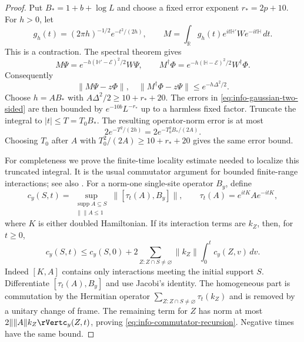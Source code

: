 \documentclass[11pt]{article}
\numberwithin{equation}{section}
\theoremstyle{definition}
\theoremstyle{remark}
\begin{document}
\begin{proof}
Put $B_*=1+b+\log L$ and choose a fixed error exponent
$r_*=2p+10$.  For $h>0$, let
\[
 g_h(t)=(2\pi h)^{-1/2}e^{-t^2/(2h)},\qquad
 M=\int_{\mathbb R}g_h(t)e^{it\mathbb H'}W e^{-it\mathbb H}\,dt.
\]
This is a contraction.  The spectral theorem gives
\[
 M\Psi=e^{-h(\mathbb H'-\mathcal E)^2/2}W\Psi,
 \qquad
 M^\dagger\Phi=e^{-h(\mathbb H-\mathcal E)^2/2}W^\dagger\Phi.
\]
Consequently
\begin{equation}
 \lVert M\Psi-z\Phi\rVert,\quad\lVert M^\dagger\Phi-z\Psi\rVert
       \le e^{-h\Delta^2/2}.
 \label{eq:info-gaussian-two-sided}
\end{equation}
Choose $h=A B_*$ with $A\Delta^2/2\ge10+r_*+20$.  The errors in
\eqref{eq:info-gaussian-two-sided} are then bounded by
$e^{-10b}L^{-r_*}$ up to a harmless fixed factor.  Truncate the integral
to $|t|\le T=T_0B_*$.  The resulting operator-norm error is at most
\[
 2e^{-T^2/(2h)}=2e^{-T_0^2 B_*/(2A)}.
\]
Choosing $T_0$ after $A$ with $T_0^2/(2A)\ge10+r_*+20$ gives the
same error bound.

For completeness we prove the finite-time locality estimate needed
to localize this truncated integral.  It is the usual commutator
argument for bounded finite-range interactions; see also
\cite{NachtergaeleOgataSims2006}.  For a norm-one single-site operator
$B_y$, define
\[
 c_y(S,t)=\sup_{\substack{\operatorname{supp} A\subseteq S\\\lVert \rVert A\le1}}
                  \lVert [\tau_t(A),B_y]\rVert,
 \qquad \tau_t(A)=e^{itK}Ae^{-itK},
\]
where $K$ is either doubled Hamiltonian.  If its interaction terms are
$k_Z$, then, for $t\ge0$,
\begin{equation}
 c_y(S,t)\le c_y(S,0)+
 2\sum_{Z:Z\cap S\ne\varnothing}\lVert k_Z\rVert
                      \int_0^t c_y(Z,v)\,dv.
 \label{eq:info-commutator-recursion}
\end{equation}
Indeed $[K,A]$ contains only interactions meeting the initial support
$S$.  Differentiate $[\tau_t(A),B_y]$ and use Jacobi's identity.
The homogeneous part is commutation by the Hermitian operator
$\sum_{Z:Z\cap S\ne\varnothing}\tau_t(k_Z)$ and is removed by a
unitary change of frame.  The remaining term for $Z$ has norm at most
$2\lVert \rVert A\lVert k_Z\rVertc_y(Z,t)$, proving
\eqref{eq:info-commutator-recursion}.  Negative times have the same
bound.


\end{proof}
\end{document}
